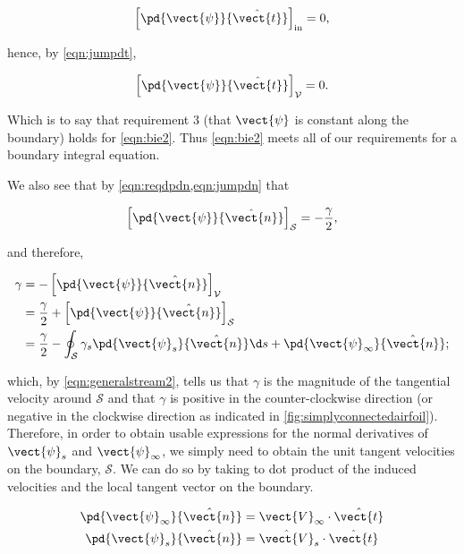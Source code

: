 \begin{equation}
    \left[\pd{\vect{\psi}}{\hat{\vect{t}}}\right]_\text{in} = 0,
\end{equation}

\noindent hence, by \cref{eqn:jumpdt},

\begin{equation}
    \left[\pd{\vect{\psi}}{\hat{\vect{t}}}\right]_\mathcal{V} = 0.
\end{equation}

\noindent Which is to say that requirement 3 (that \(\vect{\psi}\) is constant along the boundary) holds for \cref{eqn:bie2}.
%
Thus \cref{eqn:bie2} meets all of our requirements for a boundary integral equation.

We also see that by \cref{eqn:reqdpdn,eqn:jumpdn} that

\begin{equation}
    \left[\pd{\vect{\psi}}{\hat{\vect{n}}}\right]_\mathcal{S} = -\frac{\gamma}{2},
\end{equation}

\noindent and therefore,

\begin{equation}
    \begin{aligned}
        \gamma &= -\left[\pd{\vect{\psi}}{\hat{\vect{n}}}\right]_\mathcal{V} \\
          &= \frac{\gamma}{2} + \left[\pd{\vect{\psi}}{\hat{\vect{n}}}\right]_\mathcal{S} \\
          & = \frac{\gamma}{2} -  \oint_\mathcal{S} \gamma_s\pd{\vect{\psi}_s}{\hat{\vect{n}}} \d s  + \pd{\vect{\psi}_\infty}{\hat{\vect{n}}};
\end{aligned}
\end{equation}

\noindent which, by \cref{eqn:generalstream2}, tells us that \(\gamma\) is the magnitude of the tangential velocity around \(\mathcal{S}\) and that \(\gamma\) is positive in the counter-clockwise direction (or negative in the clockwise direction as indicated in \cref{fig:simplyconnectedairfoil}).
%
Therefore, in order to obtain usable expressions for the normal derivatives of \(\vect{\psi}_s\) and \(\vect{\psi}_\infty\), we simply need to obtain the unit tangent velocities on the boundary, \(\mathcal{S}\).
%
We can do so by taking to dot product of the induced velocities and the local tangent vector on the boundary.

\begin{align}
    \pd{\vect{\psi}_\infty}{\hat{\vect{n}}} &= \vect{V}_\infty \cdot \hat{\vect{t}}\\
    \pd{\vect{\psi}_s}{\hat{\vect{n}}} &= \hat{\vect{V}}_s \cdot \hat{\vect{t}}
\end{align}

